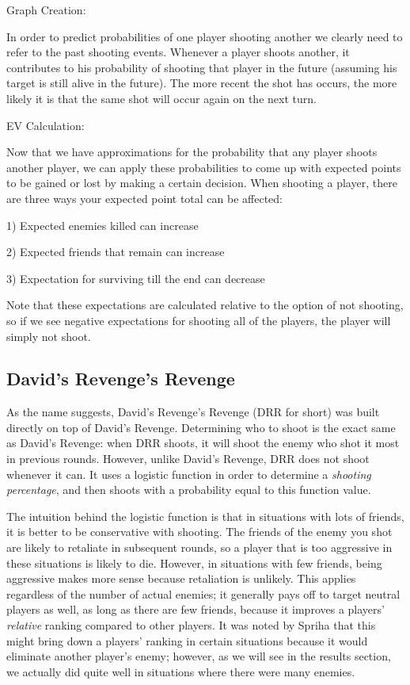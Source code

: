 \documentclass[
10pt, %
letterpaper, %
oneside, %
headinclude,footinclude, %
english
]{article}
\begin{document}
Graph Creation:

In order to predict probabilities of one player shooting another we clearly need to refer to the past shooting events. Whenever a player shoots another, it contributes to his probability of shooting that player in the future (assuming his target is still alive in the future). The more recent the shot has occurs, the more likely it is that the same shot will occur again on the next turn. 


EV Calculation:

Now that we have approximations for the probability that any player shoots another player, we can apply these probabilities to come up with expected points to be gained or lost by making a certain decision. When shooting a player, there are three ways your expected point total can be affected: 

1) Expected enemies killed can increase

2) Expected friends that remain can increase

3) Expectation for surviving till the end can decrease

Note that these expectations are calculated relative to the option of not shooting, so if we see negative expectations for shooting all of the players, the player will simply not shoot.


\subsection{David's Revenge's Revenge}

As the name suggests, David's Revenge's Revenge (DRR for short) was built directly on top of David's Revenge. Determining who to shoot is the exact same as David's Revenge: when DRR shoots, it will shoot the enemy who shot it most in previous rounds. However, unlike David's Revenge, DRR does not shoot whenever it can. It uses a logistic function in order to determine a \textit{shooting percentage}, and then shoots with a probability equal to this function value.

The intuition behind the logistic function is that in situations with lots of friends, it is better to be conservative with shooting. The friends of the enemy you shot are likely to retaliate in subsequent rounds, so a player that is too aggressive in these situations is likely to die. However, in situations with few friends, being aggressive makes more sense because retaliation is unlikely. This applies regardless of the number of actual enemies; it generally pays off to target neutral players as well, as long as there are few friends, because it improves a players' \textit{relative} ranking compared to other players. It was noted by Spriha that this might bring down a players' ranking in certain situations because it would eliminate another player's enemy; however, as we will see in the results section, we actually did quite well in situations where there were many enemies.
\end{document}
